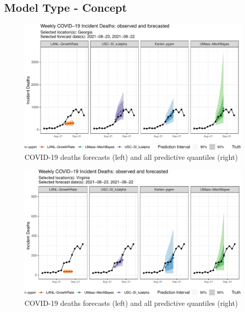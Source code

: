 \documentclass[
]{article}
\begin{document}
\hypertarget{model-type---concept}{%
\subsection{Model Type - Concept}\label{model-type---concept}}

\begin{figure}

{\centering \includegraphics{sim_analysis_5_files/figure-latex/ga_type-1} 

}

\caption{COVID-19 deaths forecasts (left) and all predictive quantiles (right)}\label{fig:ga_type}
\end{figure}

\begin{figure}

{\centering \includegraphics{sim_analysis_5_files/figure-latex/va_type-1} 

}

\caption{COVID-19 deaths forecasts (left) and all predictive quantiles (right)}\label{fig:va_type}
\end{figure}
\end{document}

